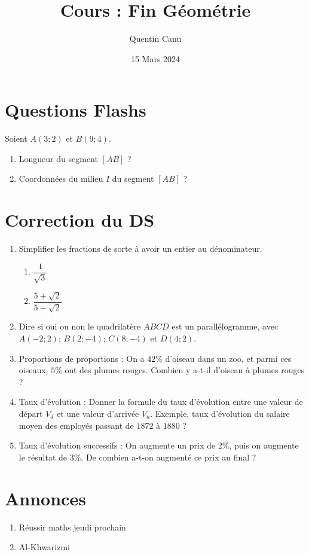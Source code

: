 \documentclass{article}
\title{Cours : Fin Géométrie}
\date{15 Mars 2024}
\author{Quentin Canu}
\begin{document}
\maketitle
\section{Questions Flashs}
Soient $A(3;2)$ et $B(9;4)$.
\begin{enumerate}
\item Longueur du segment $[AB]$ ?
\item Coordonnées du milieu $I$ du segment $[AB]$ ?
\end{enumerate}
\section{Correction du DS}
\begin{enumerate}[label=\textbf{Exercice \arabic* :}]
\item Simplifier les fractions de sorte à avoir un entier au dénominateur. 
\begin{enumerate}
    \item $\dfrac{1}{\sqrt{3}}$
    \item $\dfrac{5 + \sqrt{2}}{5 - \sqrt{2}}$
\end{enumerate}
\item Dire si oui ou non le quadrilatère $ABCD$ est un parallélogramme, avec $A(-2;2)$; $B(2;-4)$; $C(8;-4)$ et $D(4;2)$.
\item Proportions de proportions : On a $42\%$ d'oiseau dans un zoo, et parmi ces oiseaux, $5\%$ ont des plumes rouges. Combien y a-t-il d'oiseau à plumes rouges ?
\item Taux d'évolution : Donner la formule du taux d'évolution entre une valeur de départ $V_d$ et une valeur d'arrivée $V_a$. Exemple, taux d'évolution du salaire moyen des employés passant de $1872$ à $1880$ ?
\item Taux d'évolution successifs : On augmente un prix de $2\%$, puis on augmente le résultat de $3\%$. De combien a-t-on augmenté ce prix au final ?
\end{enumerate}
\section{Annonces}
\begin{enumerate}
\item Réussir maths jeudi prochain
\item Al-Khwarizmi
\end{enumerate}
\end{document}
